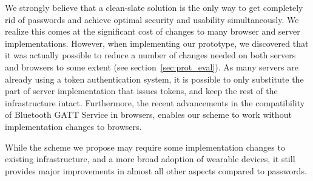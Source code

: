 We strongly believe that a clean-slate solution is the only way to get completely rid of passwords and achieve optimal security and usability simultaneously. We realize this comes at the significant cost of changes to many browser and server implementations. However, when implementing our prototype, we discovered that it was actually possible to reduce a number of changes needed on both servers and browsers to some extent (see section~\ref{sec:prot_eval}). As many servers are already using a token authentication system, it is possible to only substitute the part of server implementation that issues tokens, and keep the rest of the infrastructure intact. Furthermore, the recent advancements in the compatibility of Bluetooth GATT Service in browsers, enables our scheme to work without implementation changes to browsers. 

While the scheme we propose may require some implementation changes to existing infrastructure, and a more broad adoption of wearable devices, it still provides major improvements in almost all other aspects compared to passwords.



